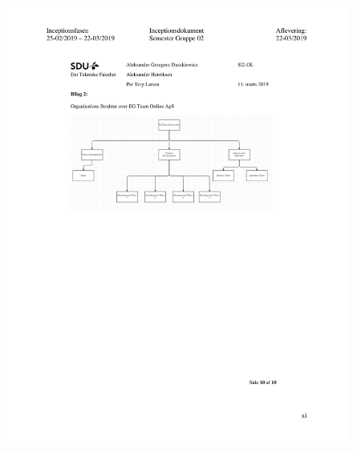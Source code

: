 \begin{figure}[hb]
  \includegraphics[scale = 0.33]{./PNG/Inceptions/Gruppe02+InceptionsDokument-44.jpg} 
\end{figure}

